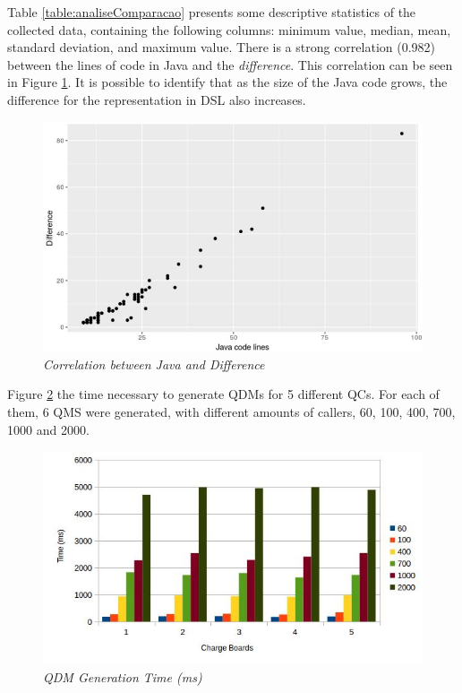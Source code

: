 
Table \ref{table:analiseComparacao} presents some descriptive statistics 
of the collected data, containing the following columns: minimum value, median, mean, standard deviation, and maximum value. 
There is a strong correlation (0.982) between the lines of code in Java and the \emph{difference}. This correlation can be seen in 
Figure \ref{fig:correlacao}. It is possible to identify that as the size of the Java code grows, 
the difference for the representation in DSL also increases.

\begin{figure}[htb!] 
\centering
  \includegraphics[width=.48\textwidth]
  {img/artigo_correlacao.jpg}
  \caption{\it Correlation between Java and Difference}
  \label{fig:correlacao}
\end{figure}

Figure \ref{fig:geracao} the time necessary to generate QDMs for 5 different QCs. For each of them, 
6 QMS were generated, with different amounts of callers, 60, 100, 400, 700, 1000 and 2000.

\begin{figure}[!ht] \centering
  \includegraphics[width=.48\textwidth]
  {img/artigo_geracao.jpg}
  \caption{\it QDM Generation Time (ms)}
  \label{fig:geracao}
\end{figure}

